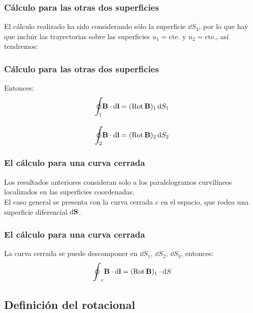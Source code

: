\documentclass[12pt]{beamer}
\begin{document}
\begin{frame}
\frametitle{Cálculo para las otras dos superficies}
El cálculo realizado ha sido considerando sólo la superficie $\dd{S_{3}}$, por lo que hay que incluir las trayectorias sobre las superficies $u_{1} = \text{cte.}$ y $u_{2} = \text{cte.}$, así tendremos:
\end{frame}
\begin{frame}
\frametitle{Cálculo para las otras dos superficies}
Entonces:
\pause
\begin{align*}
\scaleoint{6ex}_{\bs 1} \vb{B} \cdot \dd{\vb{l}} &= ({\rm{Rot}} \, \vb{B})_{1} \dd{S_{1}} \\[1em]
\scaleoint{6ex}_{\bs 2} \vb{B} \cdot \dd{\vb{l}} &= ({\rm{Rot}} \, \vb{B})_{2} \dd{S_{2}}
\end{align*}
\end{frame}
\begin{frame}
\frametitle{El cálculo para una curva cerrada}
Los resultados anteriores consideran solo a los paralelogramos curvilíneos localizados en las superficies coordenadas.
\\
\bigskip
\pause
El caso general se presenta con la curva cerrada $c$ en el espacio, que rodea una superficie diferencial $\dd{\vb{S}}$.
\end{frame}
\begin{frame}
\frametitle{El cálculo para una curva cerrada}
La curva cerrada se puede descomponer en $\dd{S_{1}}$, $\dd{S_{2}}$, $\dd{S_{3}}$, entonces:
\pause
\begin{align*}
\scaleoint{6ex}_{c} \vb{B} \cdot \dd{\vb{l}} = ({\rm{Rot}} \, \vb{B})_{1} \cdot \dd{S} 
\end{align*}
\end{frame}

\subsection{Definición del rotacional}
\end{document}

